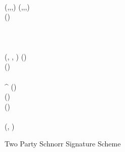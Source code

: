 \begin{figure}
\begin{center}
{\begin{varwidth}{\textwidth}
{            \< \< \varSigContext \opFunResult \procSetupCtx{\varSigContext}{\varPubKeyBob}{\varRandBob} \\
            \< \sendmessageleft*{\varSigContext, \varPubKeyBob, \varProofBob} \< \\
            \procZkpVerify{\varProofBob}  \< \< \\
            \pcreturn (\varSecKeyAlice,\varPubKeyAlice,\varNonceAlice,\varSigContext) \< \< \pcreturn (\varSecKeyBob,\varPubKeyBob,\varNonceBob,\varSigContext)
            } \\
            \procedure[linenumbering]{$\procSignPrt{\varMsg}{\varSecKeyAlice}{\varNonceAlice}{\varSigContext}$} {
            (\varRand \opSeperate \varPubKey) \opFunResult \varSigContext \\
            \varRandAlice \opAssign \funGen{\varNonceAlice} \\
            \varSchnorrChallenge \opAssign \funHash{\varMsg \opConc \varRand \opConc \varPubKey} \\
            \varSAlice \opAssign \varNonceAlice \opAddScalar \varSecKeyAlice \opTimesScalar \varSchnorrChallenge \\
            \pcreturn \varSigAlice \opAssign (\varSAlice, \varRandAlice, \varSigContext)
            }
            \procedure[linenumbering]{$\procVerfPtSig{\varSigAlice}{\varMsg}{\varPubKeyAlice}$} {
            (\varSAlice \opSeperate \varRandAlice \opSeperate \varSigContext) \opFunResult \varSigAlice \\
            (\varPubKey \opSeperate \varRand) \opFunResult \varSigContext \\
            \varSchnorrChallenge \opAssign \funHash{\varMsg \opConc \varRand \opConc \varPubKey} \\
            \pcreturn \funGen{\varSAlice} \opEq \varRandAlice^{\varSchnorrChallenge} \opAddPoint \varPubKeyAlice
            }
            \procedure[linenumbering]{$\procFinSig{\varSigAlice}{\varSigBob}$} {
            (\varSAlice \opSeperate \varRandAlice \opSeperate \varSigContext) \opFunResult \varSigAlice \\
            (\varSBob \opSeperate \varRandBob \opSeperate \varSigContext) \opFunResult \varSigBob \\
            (\varPubKey \opSeperate \varRand) \opFunResult \varSigContext \\
            \varS \opAssign \varSAlice \opAddScalar \varSBob \\
            \varSigFin \opAssign (\varS, \varRand) \\
            \pcreturn \varSigFin
            }
        \end{varwidth}
        }
    \end{center}
    \caption{Two Party Schnorr Signature Scheme}
    \label{fig:twoparty-schnorr}
\end{figure}

